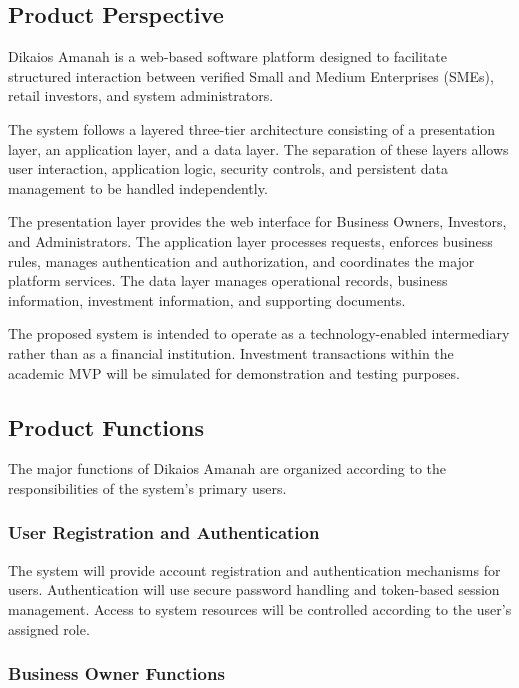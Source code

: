 \subsection{Product Perspective}

Dikaios Amanah is a web-based software platform designed to facilitate
structured interaction between verified Small and Medium Enterprises (SMEs),
retail investors, and system administrators.

The system follows a layered three-tier architecture consisting of a
presentation layer, an application layer, and a data layer. The separation
of these layers allows user interaction, application logic, security
controls, and persistent data management to be handled independently.

The presentation layer provides the web interface for Business Owners,
Investors, and Administrators. The application layer processes requests,
enforces business rules, manages authentication and authorization, and
coordinates the major platform services. The data layer manages operational
records, business information, investment information, and supporting
documents.

The proposed system is intended to operate as a technology-enabled
intermediary rather than as a financial institution. Investment transactions
within the academic MVP will be simulated for demonstration and testing
purposes.


\subsection{Product Functions}

The major functions of Dikaios Amanah are organized according to the
responsibilities of the system's primary users.

\subsubsection{User Registration and Authentication}

The system will provide account registration and authentication mechanisms
for users. Authentication will use secure password handling and token-based
session management. Access to system resources will be controlled according
to the user's assigned role.

\subsubsection{Business Owner Functions}

